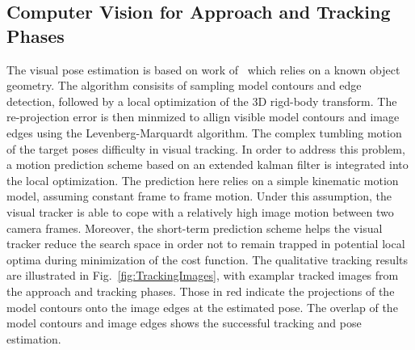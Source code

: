 \subsection{Computer Vision for Approach and Tracking Phases}
%
%
The visual pose estimation is based on work of~\cite{Drummond2002} which relies on a known object geometry. The algorithm consisits of sampling model contours and edge detection, followed by a local optimization of the 3D rigd-body transform. The re-projection error is then minmized to allign visible model contours and image edges using the Levenberg-Marquardt algorithm.
The complex tumbling motion of the target poses difficulty in visual tracking. In order to address this problem, a motion prediction scheme based on an extended kalman filter is integrated into the local optimization. The prediction here relies on a simple kinematic motion model, assuming constant frame to frame motion. Under this assumption, the visual tracker is able to cope with a relatively high image motion between two camera frames. Moreover, the short-term prediction scheme helps the visual tracker reduce the search space in order not to remain trapped in potential local optima during minimization of the cost function.  The qualitative tracking results are illustrated in Fig.~\ref{fig:TrackingImages}, with examplar tracked images from the approach and tracking phases. Those in red indicate the projections of the model contours onto the image edges at the estimated pose. The overlap of the model contours and image edges shows the successful tracking and pose estimation.
